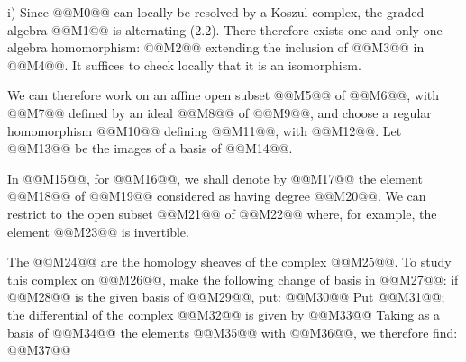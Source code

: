 i) Since @@M0@@ can locally be resolved by a Koszul complex, the graded algebra @@M1@@ is alternating (2.2). There therefore exists one and only one algebra homomorphism:
@@M2@@
extending the inclusion of @@M3@@ in
@@M4@@. It suffices to check locally that it is an isomorphism.

We can therefore work on an affine open subset @@M5@@ of @@M6@@, with @@M7@@ defined by an ideal @@M8@@ of @@M9@@, and choose a regular homomorphism @@M10@@ defining @@M11@@, with @@M12@@. Let @@M13@@ be the images of a basis of @@M14@@.

In @@M15@@, for @@M16@@, we shall denote by @@M17@@ the element @@M18@@ of @@M19@@ considered as having degree @@M20@@. We can restrict to the open subset @@M21@@ of @@M22@@ where, for example, the element @@M23@@ is invertible.

The @@M24@@ are the homology sheaves of the complex @@M25@@. To study this complex on @@M26@@, make the following change of basis in @@M27@@: if @@M28@@ is the given basis of @@M29@@, put:
@@M30@@
Put @@M31@@; the differential of the complex @@M32@@ is given by
@@M33@@
Taking as a basis of @@M34@@ the elements
@@M35@@ with @@M36@@, we therefore find:
@@M37@@
